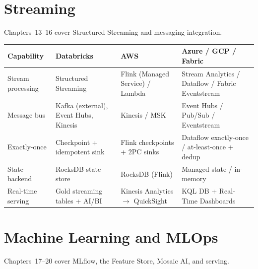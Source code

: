 \section{Streaming}
%
Chapters~13--16 cover Structured Streaming and messaging integration.

\begin{center}
\footnotesize
\begin{tabular}{@{}p{3.0cm}p{3.4cm}p{3.2cm}p{3.2cm}@{}}
\toprule
\textbf{Capability} & \textbf{Databricks} & \textbf{AWS} & \textbf{Azure / GCP / Fabric} \\
\midrule
Stream processing & Structured Streaming & Flink (Managed Service) / Lambda & Stream Analytics / Dataflow / Fabric Eventstream \\
Message bus & Kafka (external), Event Hubs, Kinesis & Kinesis / MSK & Event Hubs / Pub/Sub / Eventstream \\
Exactly-once & Checkpoint + idempotent sink & Flink checkpoints + 2PC sinks & Dataflow exactly-once / at-least-once + dedup \\
State backend & RocksDB state store & RocksDB (Flink) & Managed state / in-memory \\
Real-time serving & Gold streaming tables + AI/BI & Kinesis Analytics $\rightarrow$ QuickSight & KQL DB + Real-Time Dashboards \\
\bottomrule
\end{tabular}
\end{center}

\section{Machine Learning and MLOps}
%
Chapters~17--20 cover MLflow, the Feature Store, Mosaic AI, and serving.


